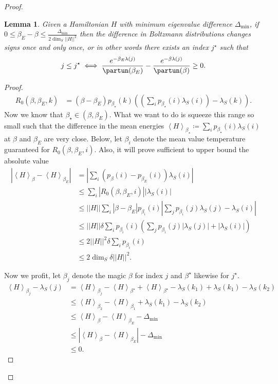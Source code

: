 \documentclass{article}
\newtheorem{lemma}[theorem]{Lemma}
\newcommand{\parens}[1]{\left( #1 \right)}
\newcommand{\abs}[1]{\left| #1 \right|}
\newcommand{\norm}[1]{\left| \left| #1 \right| \right|}
\newcommand{\anglebrackets}[1]{\left< #1 \right>}
\begin{document}
\begin{proof}
\begin{lemma} \label{lem:magic_index}
    Given a Hamiltonian $H$ with minimum eigenvalue difference $\Delta_{\min}$, if $0 \le \beta_E - \beta \le \frac{\Delta_{\min}}{2 \dim_S \norm{H}^2}$ then the difference in Boltzmann distributions changes signs once and only once, or in other words there exists an index $j^\star$ such that
    \begin{equation}
         j \le j^\star \iff \frac{e^{-\beta_E \lambda(j)}}{\partun(\beta_E)} -\frac{e^{-\beta \lambda(j)}}{\partun(\beta)} \ge 0 .
    \end{equation}
\end{lemma}
\begin{proof}
\begin{align}
    R_0(\beta, \beta_E, k) &= (\beta - \beta_E) p_{\beta_{\star}}(k) \parens{\parens{\sum_i p_{\beta_{\star}}(i) \lambda_S(i)} - \lambda_S(k)}.
\end{align}
Now we know that $\beta_{\star} \in (\beta, \beta_E)$. What we want to do is squeeze this range so small such that the difference in the mean energies $\anglebrackets{H}_{\beta_{\star}} \coloneqq \sum_i p_{\beta_{\star}}(i) \lambda_S(i)$ at $\beta$ and $\beta_E$ are very close. Below, let $\beta_i$ denote the mean value temperature guaranteed for $R_0(\beta, \beta_E, i)$. Also, it will prove sufficient to upper bound the absolute value
\begin{align}
    \abs{\anglebrackets{H}_{\beta} - \anglebrackets{H}_{\beta_E}} &= \left| \sum_i (p_{\beta}(i) - p_{\beta_E}(i)) \lambda_S(i) \right| \\
    &\leq \sum_i \abs{R_0(\beta, \beta_E, i)} \abs{\lambda_S(i)} \\
    &\leq \norm{H} \sum_i |\beta - \beta_E| p_{\beta_i}(i) \abs{\sum_j p_{\beta_i}(j) \lambda_S(j) - \lambda_S(i)} \\
    &\leq \norm{H} \delta \sum_i p_{\beta_i}(i) \parens{\sum_{j} p_{\beta_i}(j) \abs{\lambda_S(j)} + \abs{\lambda_S(i)}} \\
    &\leq 2 \norm{H}^2 \delta \sum_i p_{\beta_i}(i) \\
    &\leq 2 \dim_S \delta \norm{H}^2.
\end{align}

Now we profit, let $\beta_j$ denote the magic $\beta$ for index $j$ and $\beta^\star$ likewise for $j^\star$. 
\begin{align}
    \anglebrackets{H}_{\beta_j} - \lambda_S(j) &= \anglebrackets{H}_{\beta_j} - \anglebrackets{H}_{\beta^\star} + \anglebrackets{H}_{\beta^\star} - \lambda_S(k_1) + \lambda_S(k_1) - \lambda_S(k_2) \\
    &\leq \anglebrackets{H}_{\beta_2} - \anglebrackets{H}_{\beta_1} + \lambda_S(k_1) - \lambda_S(k_2) \\
    &\leq \anglebrackets{H}_{\beta} - \anglebrackets{H}_{\beta_E} - \Delta_{\min} \\
    &\leq \abs{\anglebrackets{H}_{\beta} - \anglebrackets{H}_{\beta_E}} - \Delta_{\min} \\
    &\leq 0.
\end{align}


\end{proof}
\end{proof}
\end{document}
